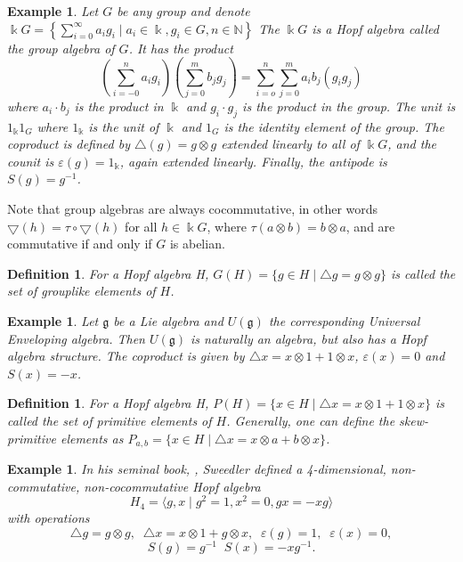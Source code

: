 \documentclass[12pt,a4paper]{article}
\newtheorem{example}[theorem]{Example}
\newtheorem{definition}[theorem]{Definition}
\newcommand\NN{\mathbb{N}}
\newcommand{\kk}{\Bbbk}
\newcommand\1{_{(1)}}
\newcommand\2{_{(2)}}
\begin{document}
\begin{example}
    Let $G$ be any group and denote $\kk G=\left\{\sum_{i=0}^\infty a_i g_i\;\vert\; a_i\in\kk, g_i\in G, n\in\NN\right\}$
    The $\kk G$ is a Hopf algebra called the group algebra of $G$.
    It has the product
    \[
    \left(\sum_{i=-0}^n a_i g_i\right)\left(\sum_{j=0}^m b_j g_j\right)=\sum_{i=o}^n\sum_{j=0}^m a_i b_j (g_i g_j)
    \]
    where $a_i\cdot b_j$ is the product in $\kk$ and $g_i\cdot g_j$ is the product in the group.
    The unit is $1_\kk 1_G$ where $1_\kk$ is the unit of $\kk$ and $1_G$ is the identity element of the group.
    The coproduct is defined by $\triangle(g)=g\otimes g$ extended linearly to all of $\kk G$, and the counit is $\varepsilon(g)=1_\kk$, again extended linearly.
    Finally, the antipode is $S(g)=g^{-1}$.
\end{example}

Note that group algebras are always cocommutative, in other words $\bigtriangledown(h)=\tau\circ\bigtriangledown(h)$ for all $h\in \kk G$, where $\tau(a\otimes b)=b\otimes a$, and are commutative if and only if $G$ is abelian.

\begin{definition}
    For a Hopf algebra H, $G(H)=\{g\in H\;\vert\; \triangle{g}=g\otimes g\}$ is called the set of grouplike elements of $H$.
\end{definition}

\begin{example}
    Let $\mathfrak{g}$ be a Lie algebra and $U(\mathfrak{g})$ the corresponding Universal Enveloping algebra.
    Then $U(\mathfrak{g})$ is naturally an algebra, but also has a Hopf algebra structure.
    The coproduct is given by $\triangle{x}=x\otimes 1+1\otimes x$, $\varepsilon(x)=0$ and $S(x)=-x$.
\end{example}

\begin{definition}
    For a Hopf algebra H, $P(H)=\{x\in H\;\vert\; \triangle{x}=x\otimes 1+1\otimes x\}$ is called the set of primitive elements of $H$.
    Generally, one can define the skew-primitive elements as $P_{a,b}=\{x\in H\;\vert\; \triangle{x}=x\otimes a+b\otimes x\}$.
\end{definition}

\begin{example}
    In his seminal book, \cite{Sw}, Sweedler defined a 4-dimensional, non-commutative, non-cocommutative Hopf algebra
    \[
    H_4=\langle g,x\;\vert\; g^2=1, x^2=0,gx=-xg\rangle
    \]
    with operations
    \[
    \triangle{g}=g\otimes g,\;\; \triangle{x}=x\otimes 1+g\otimes x,\;\;\varepsilon(g)=1,\;\;\varepsilon(x)=0,
    \]
    \[
    S(g)=g^{-1}\;\;S(x)=-xg^{-1}.
    \]
\end{example}
\end{document}
